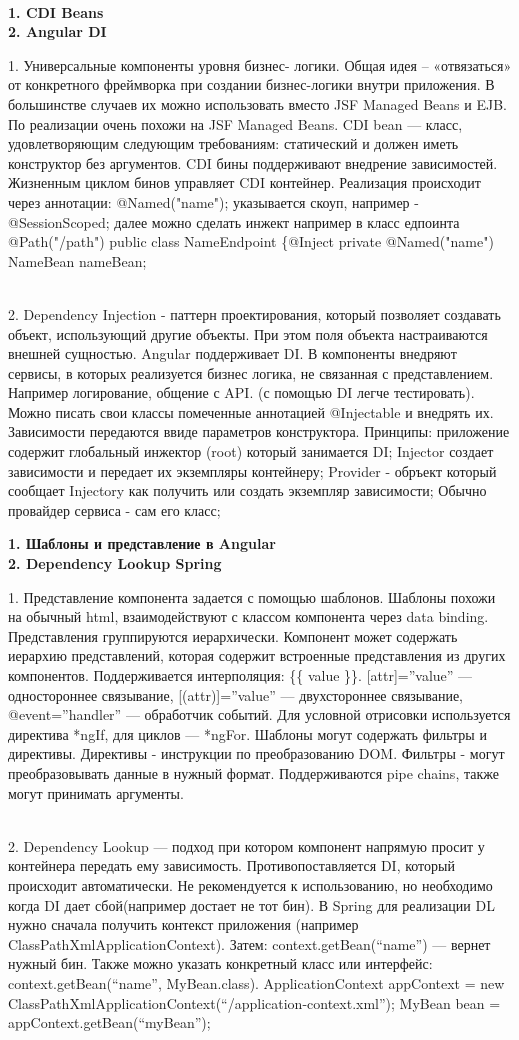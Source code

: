 \documentclass{article}
\newcommand{\bil}[4]{%
    \begin{minipage}{.3\textwidth}
        \textbf{1. #1} \\
        \textbf{2. #2}

        1. #3
        \\
        2. #4
    \end{minipage}
}
\begin{document}
\\
\bil{CDI Beans }{Angular DI}{
    Универсальные компоненты уровня бизнес- логики.
    Общая идея – «отвязаться» от конкретного фреймворка при создании бизнес-логики внутри приложения.
    В большинстве случаев их можно использовать вместо JSF Managed Beans и EJB. По реализации очень похожи на JSF Managed Beans.
    CDI bean — класс, удовлетворяющим следующим требованиям: статический и должен иметь конструктор без аргументов.
    CDI бины поддерживают внедрение зависимостей. Жизненным циклом бинов управляет CDI контейнер.
    Реализация происходит через аннотации: @Named("name"); указывается скоуп, например - @SessionScoped; далее можно сделать инжект например в класс едпоинта
    @Path("/path") public class NameEndpoint \{@Inject private @Named("name") NameBean nameBean;
}{
    Dependency Injection - паттерн проектирования, который позволяет создавать объект, использующий другие объекты. При этом поля объекта настраиваются внешней сущностью. 
    Angular поддерживает DI. В компоненты внедряют сервисы, в которых реализуется бизнес логика, не связанная с представлением. 
    Например логирование, общение с API. (с помощью DI легче тестировать). Можно писать свои классы помеченные аннотацией @Injectable и внедрять их. Зависимости передаются ввиде параметров конструктора.
    Принципы: приложение содержит глобальный инжектор (root) который занимается DI;
    Injector создает зависимости и передает их экземпляры контейнеру;
    Provider - обръект который сообщает Injectory как получить или создать экземпляр зависимости;
    Обычно провайдер сервиса - сам его класс;
}
\hfill
\bil{Шаблоны и представление в Angular}{Dependency Lookup Spring}{
    Представление компонента задается с помощью шаблонов.
    Шаблоны похожи на обычный html, взаимодействуют с классом компонента через data binding. 
    Представления группируются иерархически.
    Компонент может содержать иерархию представлений, которая содержит встроенные представления из других компонентов.	
    Поддерживается интерполяция: \{\{ value \}\}. [attr]=”value” — одностороннее связывание, [(attr)]=”value” — двухстороннее связывание, 
    @event=”handler” — обработчик событий. Для условной отрисовки используется директива *ngIf, для циклов — *ngFor.
    Шаблоны могут содержать фильтры и директивы. Директивы - инструкции по преобразованию DOM.
    Фильтры - могут преобразовывать данные в нужный формат. Поддерживаются pipe chains, также могут принимать аргументы.
}{
    Dependency Lookup — подход при котором компонент напрямую просит у контейнера передать ему зависимость. 
    Противопоставляется DI, который происходит автоматически. Не рекомендуется к использованию, но необходимо когда DI дает сбой(например достает не тот бин).
    В Spring для реализации DL нужно сначала получить контекст приложения (например ClassPathXmlApplicationContext). 
    Затем: context.getBean(“name”) — вернет нужный бин. Также можно указать конкретный класс или интерфейс: context.getBean(“name”, MyBean.class).
    ApplicationContext appContext = new ClassPathXmlApplicationContext(“/application-context.xml”);
    MyBean bean = appContext.getBean(“myBean”);

}
\end{document}
